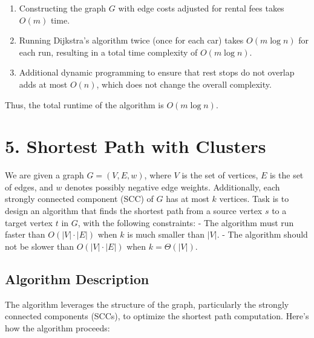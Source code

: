 \documentclass[11pt]{article}
\begin{document}
\begin{enumerate}
    \item Constructing the graph \( G \) with edge costs adjusted for rental fees takes \( O(m) \) time.
    \item Running Dijkstra’s algorithm twice (once for each car) takes \( O(m \log n) \) for each run, resulting in a total time complexity of \( O(m \log n) \).
    \item Additional dynamic programming to ensure that rest stops do not overlap adds at most \( O(n) \), which does not change the overall complexity.
\end{enumerate}

Thus, the total runtime of the algorithm is \( O(m \log n) \).



\newpage

\section*{5. Shortest Path with Clusters}

We are given a graph \( G = (V, E, w) \), where \( V \) is the set of vertices, \( E \) is the set of edges, and \( w \) denotes possibly negative edge weights. Additionally, each strongly connected component (SCC) of \( G \) has at most \( k \) vertices. Task is to design an algorithm that finds the shortest path from a source vertex \( s \) to a target vertex \( t \) in \( G \), with the following constraints:
- The algorithm must run faster than \( O(|V| \cdot |E|) \) when \( k \) is much smaller than \( |V| \).
- The algorithm should not be slower than \( O(|V| \cdot |E|) \) when \( k = \Theta(|V|) \).

\subsection*{Algorithm Description}

The algorithm leverages the structure of the graph, particularly the strongly connected components (SCCs), to optimize the shortest path computation. Here's how the algorithm proceeds:
\end{document}
